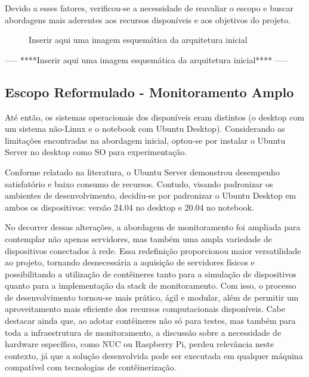 {Devido a esses fatores, verificou-se a necessidade de reavaliar o escopo e buscar abordagens mais aderentes aos recursos disponíveis e aos objetivos do projeto.

\begin{figure}[H]
\centering
\fbox{\rule{0pt}{150pt} \rule{200pt}{0pt}} %
\caption{Inserir aqui uma imagem esquemática da arquitetura inicial}
\label{fig:placeholder}
\end{figure}

-----
****Inserir aqui uma imagem esquemática da arquitetura inicial****
-----

\subsection{Escopo Reformulado - Monitoramento Amplo}
\label{subsection:EscopoReformulado}

Até então, os sistemas operacionais dos  disponíveis eram distintos (o desktop com um sistema não-Linux e o notebook com Ubuntu Desktop). Considerando as limitações encontradas na abordagem inicial, optou-se por instalar o Ubuntu Server no desktop como SO para experimentação.

Conforme relatado na literatura, o Ubuntu Server demonstrou desempenho satisfatório e baixo consumo de recursos. Contudo, visando padronizar os ambientes de desenvolvimento, decidiu-se por padronizar o Ubuntu Desktop em ambos os dispositivos: versão 24.04 no desktop e 20.04 no notebook.

No decorrer dessas alterações, a abordagem de monitoramento foi ampliada para contemplar não apenas servidores, mas também uma ampla variedade de dispositivos conectados à rede. Essa redefinição proporcionou maior versatilidade ao projeto, tornando desnecessária a aquisição de servidores físicos e possibilitando a utilização de contêineres tanto para a simulação de dispositivos quanto para a implementação da stack de monitoramento. Com isso, o processo de desenvolvimento tornou-se mais prático, ágil e modular, além de permitir um aproveitamento mais eficiente dos recursos computacionais disponíveis. Cabe destacar ainda que, ao adotar contêineres não só para testes, mas também para toda a infraestrutura de monitoramento, a discussão sobre a necessidade de hardware específico, como NUC ou Raspberry Pi, perdeu relevância neste contexto, já que a solução desenvolvida pode ser executada em qualquer máquina compatível com tecnologias de contêinerização.

}
